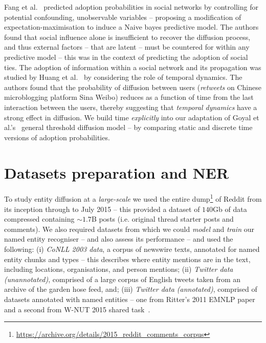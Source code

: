 \documentclass[sigconf]{acmart}
\begin{document}
Fang et al.~\cite{fang2013predicting} predicted adoption probabilities in social networks by controlling for potential confounding, unobservable variables -- proposing a modification of expectation-maximisation to induce a Naive bayes predictive model.
The authors found that social influence alone is insufficient to recover the diffusion process, and thus external factors -- that are latent -- must be countered for within any predictive model -- this was in the context of predicting the adoption of social ties.
The adoption of information within a social network and its propagation was studied by Huang et al.~\cite{huang2014temporal} by considering the role of temporal dynamics.
The authors found that the probability of diffusion between users (\emph{retweets} on Chinese microblogging platform Sina Weibo) reduces as a function of time from the last interaction between the users, thereby suggesting that \emph{temporal dynamics} have a strong effect in diffusion.
We build time \emph{explicitly} into our adaptation of Goyal et al.'s~\cite{goyal2010learning} general threshold diffusion model -- by comparing static and discrete time versions of adoption probabilities.



%


\section{Datasets preparation and NER}
\label{sec:datasets_ner} 
To study entity diffusion at a \emph{large-scale} we used the entire dump\footnote{\url{https://archive.org/details/2015_reddit_comments_corpus}} of Reddit from its inception through to July 2015 -- this provided a dataset of $140$Gb of data compressed containing $\sim1.7$B posts (i.e. original thread starter posts and comments).
We also required datasets from which we could \emph{model} and \emph{train} our named entity recogniser -- and also assess its performance -- and used the following:
(i) \emph{CoNLL 2003 data}, a corpus of newswire texts, annotated for named entity chunks and types -- this describes where entity mentions are in the text, including locations, organisations, and person mentions; 
(ii) \emph{Twitter data (unannotated)}, comprised of a large corpus of English tweets taken from an archive of the garden hose feed, and; 
(iii) \emph{Twitter data (annotated)}, comprised of datasets annotated with named entities -- one from Ritter's 2011 EMNLP paper~\cite{ritter2011named} and a second from W-NUT 2015 shared task~\cite{baldwin2015shared}.
\end{document}
